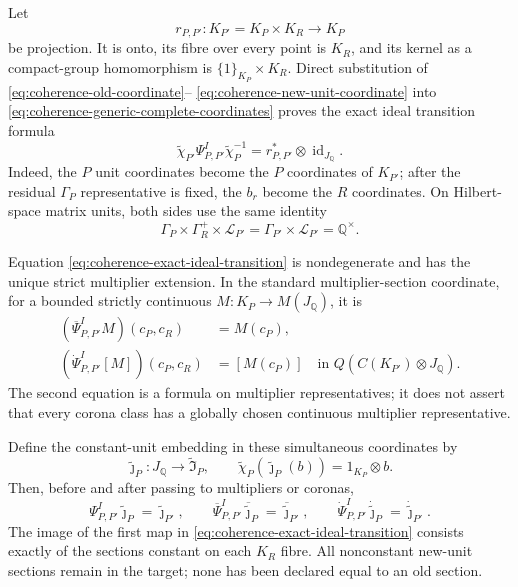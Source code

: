 Let
\begin{equation}
 r_{P,P'}:K_{P'}=K_P\times K_R\longrightarrow K_P
 \label{eq:coherence-unit-projection}
\end{equation}
be projection.  It is onto, its fibre over every point is $K_R$, and its
kernel as a compact-group homomorphism is $\{1\}_{K_P}\times K_R$.  Direct
substitution of
\eqref{eq:coherence-old-coordinate}--
\eqref{eq:coherence-new-unit-coordinate} into
\eqref{eq:coherence-generic-complete-coordinates} proves the exact ideal
transition formula
\begin{equation}
 \widetilde\chi_{P'}\Psi^I_{P,P'}\widetilde\chi_P^{-1}
 =r_{P,P'}^*\otimes\operatorname{id}_{J_{\mathbb Q}}.
 \label{eq:coherence-exact-ideal-transition}
\end{equation}
Indeed, the $P$ unit coordinates become the $P$ coordinates of $K_{P'}$;
after the residual $\Gamma_P$ representative is fixed, the $b_r$ become the
$R$ coordinates.  On Hilbert-space matrix units, both sides use the same
identity
\[
 \Gamma_P\times\Gamma_R^+\times\mathcal L_{P'}
 =\Gamma_{P'}\times\mathcal L_{P'}=\mathbb Q^\times.
\]

Equation \eqref{eq:coherence-exact-ideal-transition} is nondegenerate and has
the unique strict multiplier extension.  In the standard multiplier-section
coordinate, for a bounded strictly continuous
$M:K_P\to M(J_{\mathbb Q})$, it is
\begin{align}
 (\overline\Psi^I_{P,P'}M)(c_P,c_R)&=M(c_P),
 \label{eq:coherence-ideal-multiplier-map}\\
 (\dot\Psi^I_{P,P'}[M])(c_P,c_R)&=[M(c_P)]
 \quad\text{in }Q(C(K_{P'})\otimes J_{\mathbb Q}).
 \label{eq:coherence-ideal-corona-map}
\end{align}
The second equation is a formula on multiplier representatives; it does not
assert that every corona class has a globally chosen continuous multiplier
representative.

Define the constant-unit embedding in these simultaneous coordinates by
\begin{equation}
 \widetilde\jmath_P:J_{\mathbb Q}\longrightarrow
 \widetilde{\mathfrak I}_P,
 \qquad
 \widetilde\chi_P(\widetilde\jmath_P(b))=1_{K_P}\otimes b.
 \label{eq:coherence-constant-ideal-embedding}
\end{equation}
Then, before and after passing to multipliers or coronas,
\begin{equation}
 \Psi^I_{P,P'}\widetilde\jmath_P=\widetilde\jmath_{P'},
 \qquad
 \overline\Psi^I_{P,P'}\overline{\widetilde\jmath}_P
 =\overline{\widetilde\jmath}_{P'},
 \qquad
 \dot\Psi^I_{P,P'}\dot{\widetilde\jmath}_P
 =\dot{\widetilde\jmath}_{P'}.
 \label{eq:coherence-constant-multiplier-corona-squares}
\end{equation}
The image of the first map in
\eqref{eq:coherence-exact-ideal-transition} consists exactly of the sections
constant on each $K_R$ fibre.  All nonconstant new-unit sections remain in
the target; none has been declared equal to an old section.


